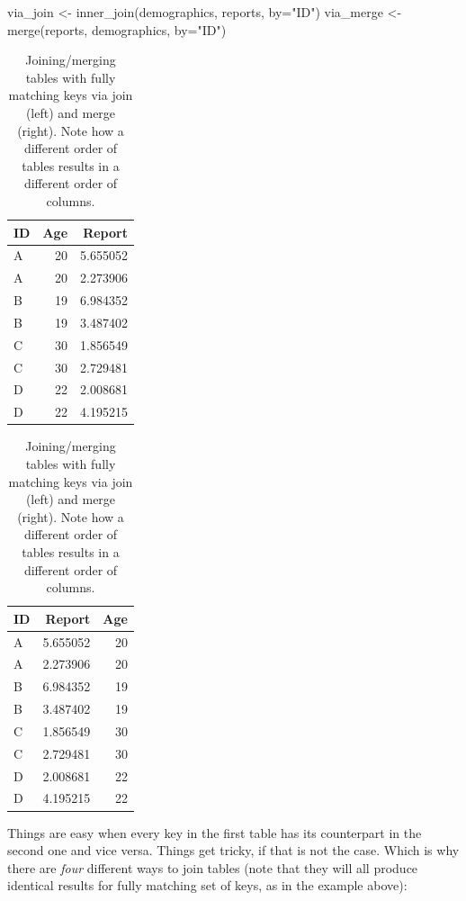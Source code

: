 \documentclass[
]{book}
\newenvironment{Shaded}{\begin{snugshade}}{\end{snugshade}}
\newcommand{\AttributeTok}[1]{\textcolor[rgb]{0.77,0.63,0.00}{#1}}
\newcommand{\FunctionTok}[1]{\textcolor[rgb]{0.00,0.00,0.00}{#1}}
\newcommand{\NormalTok}[1]{#1}
\newcommand{\OtherTok}[1]{\textcolor[rgb]{0.56,0.35,0.01}{#1}}
\newcommand{\StringTok}[1]{\textcolor[rgb]{0.31,0.60,0.02}{#1}}
\begin{document}
\begin{Shaded}
\begin{Highlighting}[]
\NormalTok{via\_join }\OtherTok{\textless{}{-}} \FunctionTok{inner\_join}\NormalTok{(demographics, reports, }\AttributeTok{by=}\StringTok{"ID"}\NormalTok{)}
\NormalTok{via\_merge }\OtherTok{\textless{}{-}} \FunctionTok{merge}\NormalTok{(reports, demographics, }\AttributeTok{by=}\StringTok{"ID"}\NormalTok{)}
\end{Highlighting}
\end{Shaded}

\begin{table}
\caption{\label{tab:unnamed-chunk-178}Joining/merging tables with fully matching keys via join (left) and merge (right). Note how a different order of tables results in a different order of columns.}

\centering
\begin{tabular}[t]{l|r|r}
\hline
ID & Age & Report\\
\hline
A & 20 & 5.655052\\
\hline
A & 20 & 2.273906\\
\hline
B & 19 & 6.984352\\
\hline
B & 19 & 3.487402\\
\hline
C & 30 & 1.856549\\
\hline
C & 30 & 2.729481\\
\hline
D & 22 & 2.008681\\
\hline
D & 22 & 4.195215\\
\hline
\end{tabular}
\centering
\begin{tabular}[t]{l|r|r}
\hline
ID & Report & Age\\
\hline
A & 5.655052 & 20\\
\hline
A & 2.273906 & 20\\
\hline
B & 6.984352 & 19\\
\hline
B & 3.487402 & 19\\
\hline
C & 1.856549 & 30\\
\hline
C & 2.729481 & 30\\
\hline
D & 2.008681 & 22\\
\hline
D & 4.195215 & 22\\
\hline
\end{tabular}
\end{table}

Things are easy when every key in the first table has its counterpart in the second one and vice versa. Things get tricky, if that is not the case. Which is why there are \emph{four} different ways to join tables (note that they will all produce identical results for fully matching set of keys, as in the example above):
\end{document}
